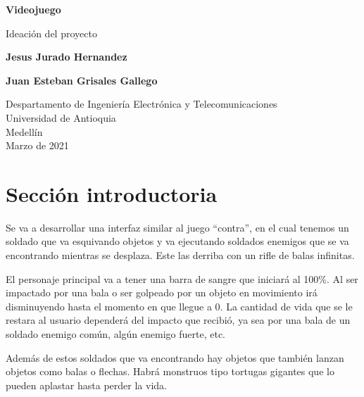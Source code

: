 \documentclass{article}
\begin{document}
\begin{titlepage}
    \begin{center}
        \vspace*{1cm}
            
        \Huge
        \textbf{Videojuego}
            
        \vspace{0.5cm}
        \LARGE
        Ideación del proyecto
            
        \vspace{1.5cm}
            
        \textbf{Jesus Jurado Hernandez}
        \vspace{0.5 cm}
        
        \textbf{Juan Esteban Grisales Gallego}
        
        
            
        \vfill
        
        \vspace{0.8cm}
            
        \Large
        Despartamento de Ingeniería Electrónica y Telecomunicaciones\\
        Universidad de Antioquia\\
        Medellín\\
        Marzo de 2021
            
    \end{center}
\end{titlepage}

\tableofcontents
\newpage
\section{Sección introductoria}\label{intro}

Se va a desarrollar una interfaz similar al juego “contra”, en el cual tenemos un soldado que va esquivando objetos y va ejecutando soldados enemigos que se va encontrando mientras se desplaza. Este las derriba con un rifle de balas infinitas. 

El personaje principal va a tener una barra de sangre que iniciará al 100\%. Al ser impactado por una bala o ser golpeado por un objeto en movimiento irá disminuyendo hasta el momento en que llegue a 0. La cantidad de vida que se le restara al usuario dependerá del impacto que recibió, ya sea por una bala de un soldado enemigo común, algún enemigo fuerte, etc.

Además de estos soldados que va encontrando hay objetos que también lanzan objetos como balas o flechas. Habrá monstruos tipo tortugas gigantes que lo pueden aplastar hasta perder la vida.
\end{document}
